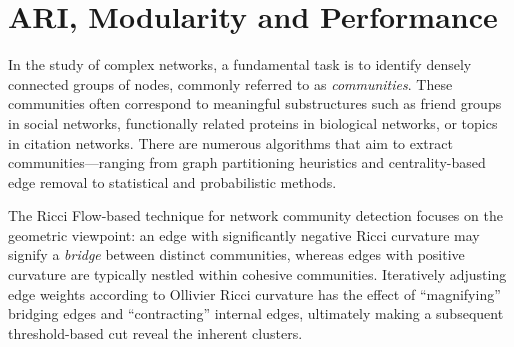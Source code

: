 \section{ARI, Modularity and Performance}
\label{sec:ricci_flow_networks}

In the study of complex networks, a fundamental task is to identify densely connected groups of nodes, commonly referred to as \emph{communities}. These communities often correspond to meaningful substructures such as friend groups in social networks, functionally related proteins in biological networks, or topics in citation networks. There are numerous algorithms that aim to extract communities---ranging from graph partitioning heuristics and centrality-based edge removal to statistical and probabilistic methods.

The Ricci Flow-based technique for network community detection focuses on the geometric viewpoint: an edge with significantly negative Ricci curvature may signify a \emph{bridge} between distinct communities, whereas edges with positive curvature are typically nestled within cohesive communities. Iteratively adjusting edge weights according to Ollivier Ricci curvature has the effect of “magnifying” bridging edges and “contracting” internal edges, ultimately making a subsequent threshold-based cut reveal the inherent clusters.

